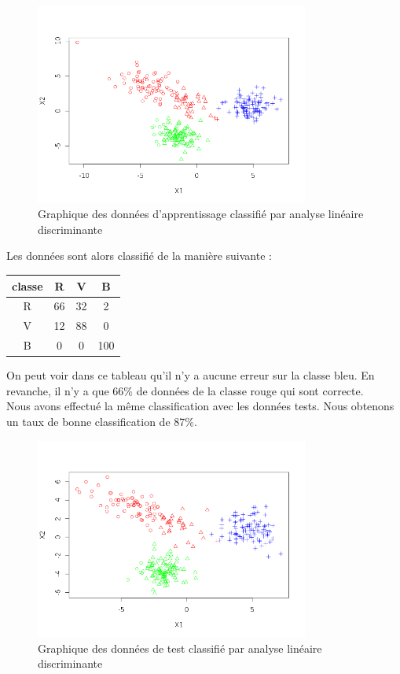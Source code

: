 \documentclass[a4paper,11pt]{article}
\begin{document}
  \begin{figure}[H]
  \center
   \includegraphics[width=9cm]{apprentissage_acp.png}
   \caption{Graphique des données d'apprentissage classifié par analyse linéaire discriminante}
  \end{figure}

  Les données sont alors classifié de la manière suivante :
  \begin{center}
  \begin{tabular}{|c|c|c|c|}
   \hline
   classe & R & V & B\\
   \hline
   R & 66 & 32 & 2 \\
   \hline
   V & 12 & 88 & 0 \\
   \hline
   B & 0 & 0 & 100 \\
   \hline
  \end{tabular}
  \end{center}

  On peut voir dans ce tableau qu'il n'y a aucune erreur sur la classe bleu. En revanche, il n'y a que 66\%
  de données de la classe rouge qui sont correcte.\\
  
  Nous avons effectué la même classification avec les données tests. Nous obtenons un taux de bonne classification
  de 87\%.
  
  \begin{figure}[H]
  \center
   \includegraphics[width=9cm]{test_acp.png}
   \caption{Graphique des données de test classifié par analyse linéaire discriminante}
  \end{figure}
  
\end{document}
